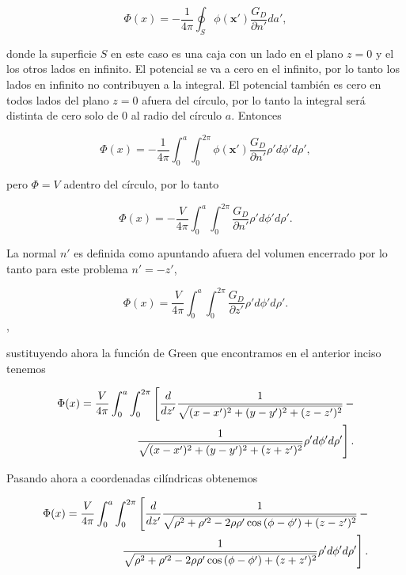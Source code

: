 \documentclass[a4paper,11pt]{article}
\numberwithin{equation}{section}
\newcommand{\zerodel}{.\kern-\nulldelimiterspace}
\begin{document}
\begin{equation}
  \Phi(x) = - \frac{1}{4\pi}\oint_S \phi(\mathbf{x}')\frac{G_D}{\partial n'}da',
\end{equation}

donde la superficie $S$ en este caso es una caja con un lado en el plano $z=0$ y el los 
otros lados en infinito. El potencial se va a cero en el infinito, por lo tanto los 
lados en infinito no contribuyen a la integral. El potencial también es cero en todos 
lados del plano $z=0$ afuera del círculo, por lo tanto la integral será distinta de 
cero solo de $0$ al radio del círculo $a$. Entonces 

\begin{equation}
 \Phi(x) = - \frac{1}{4\pi}\int_0^a \int_0^{2\pi} \phi(\mathbf{x}')\frac{G_D}{\partial n'}
 \rho'd\phi'd\rho',
\end{equation}

pero $\Phi = V$ adentro del círculo, por lo tanto 

\begin{equation}
 \Phi(x) = - \frac{V}{4\pi}\int_0^a \int_0^{2\pi} \frac{G_D}{\partial n'}
 \rho'd\phi'd\rho'.
\end{equation}

La normal $n'$ es definida como apuntando afuera del volumen encerrado por lo tanto 
para este problema $n' = -z'$, 

\begin{equation}
 \Phi(x) = \frac{V}{4\pi}\int_0^a \int_0^{2\pi} \frac{G_D}{\partial z'}
 \rho'd\phi'd\rho'.
\end{equation},

sustituyendo ahora la función de Green que encontramos en el anterior inciso tenemos 

\begin{align*}
  \Phi(x) = \frac{V}{4\pi}\int_0^a \int_0^{2\pi}\left[ \frac{d}{dz'}
  \frac{1}{\sqrt{(x-x')^2 + (y-y')^2 + (z-z')^2}}\right\zerodel - \\
 \left\zerodel\frac{1}{\sqrt{(x-x')^2 + (y-y')^2 + (z+z')^2}}
 \rho'd\phi'd\rho'\right].
\end{align*}

Pasando ahora a coordenadas cilíndricas obtenemos 

\begin{align*}
 \Phi(x) = \frac{V}{4\pi}\int_0^a \int_0^{2\pi}\left[ \frac{d}{dz'}
  \frac{1}{\sqrt{\rho^2 + \rho'^2 - 2\rho\rho'\cos{(\phi - \phi')} + (z-z')^2}}\right\zerodel - \\
 \left\zerodel\frac{1}{\sqrt{\rho^2 + \rho'^2 - 2\rho\rho'\cos{(\phi - \phi')} + (z+z')^2}}
 \rho'd\phi'd\rho'\right].
\end{align*}
\end{document}
